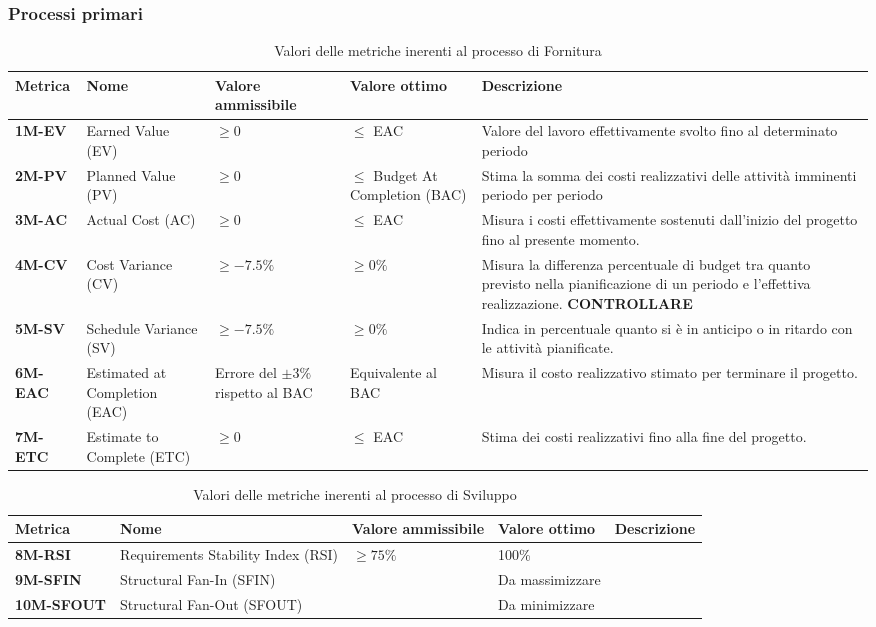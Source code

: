 \subsubsection{Processi primari}
\begin{table}[h!]
    \centering
    \begin{tabularx}{\textwidth}{|X|X|X|X|X|} 
		\hline
		\textbf{Metrica} 	& \textbf{Nome} & \textbf{Valore ammissibile} & \textbf{Valore ottimo}& \textbf{Descrizione}\\  	 
		\hline
		\textbf{1M-EV} 	& Earned Value (EV) 			& $\geq 0$ 						& $\leq$ EAC &  Valore del lavoro effettivamente svolto fino al determinato periodo\\
		\hline
		\textbf{2M-PV} 	& Planned Value (PV) 			& $\geq 0$ 						& $\leq$ Budget At Completion (BAC) &  Stima la somma dei costi realizzativi delle attività imminenti periodo per periodo\\ 
		\hline
		\textbf{3M-AC} 	& Actual Cost (AC) 				& $\geq 0$ 						& $\leq$ EAC &	Misura i costi effettivamente sostenuti dall'inizio del progetto fino al presente momento.\\ 
		\hline
		\textbf{4M-CV} 	& Cost Variance (CV) 			& $\geq -7.5\%$ 				& $\geq 0\%$ & Misura la differenza percentuale di budget tra quanto previsto nella pianificazione di un periodo e l'effettiva realizzazione. \textbf{CONTROLLARE}\\ 
		\hline
		\textbf{5M-SV} 	& Schedule Variance (SV) 		& $\geq -7.5\%$ 				& $\geq 0\%$ &Indica in percentuale quanto si è in anticipo o in ritardo con le attività pianificate.\\ 
		\hline
		\textbf{6M-EAC} 	& Estimated at Completion (EAC) & Errore del $\pm 3\%$ rispetto al BAC  & Equivalente al BAC & Misura il costo realizzativo stimato per terminare il progetto.\\ 
		\hline
		\textbf{7M-ETC} 	& Estimate to Complete (ETC)  	& $\geq 0$						 & $\leq$ EAC & Stima dei costi realizzativi fino alla fine del progetto.\\ 
		\hline
    \end{tabularx}
    \caption{ Valori delle metriche inerenti al processo di Fornitura}
    \label{table:1}
\end{table}
\begin{table}[h!]
	\centering
	\begin{tabularx}{\textwidth}{|X|X|X|X|X|} 	 
		\hline
		\textbf{Metrica} 	& \textbf{Nome} & \textbf{Valore ammissibile} & \textbf{Valore ottimo} & \textbf{Descrizione}\\  	 
		\hline
		\textbf{8M-RSI} 		& Requirements Stability Index (RSI) 	& $\geq 75\% $ 			& 100\% & \\
		\hline
		\textbf{9M-SFIN} 		& Structural Fan-In (SFIN) 				&  						& Da massimizzare & \\ 
		\hline
		\textbf{10M-SFOUT} 		& Structural Fan-Out (SFOUT) 			&  						& Da minimizzare & \\ 
		\hline
	\end{tabularx}
	\caption{ Valori delle metriche inerenti al processo di Sviluppo}
	\label{table:2}
\end{table}
